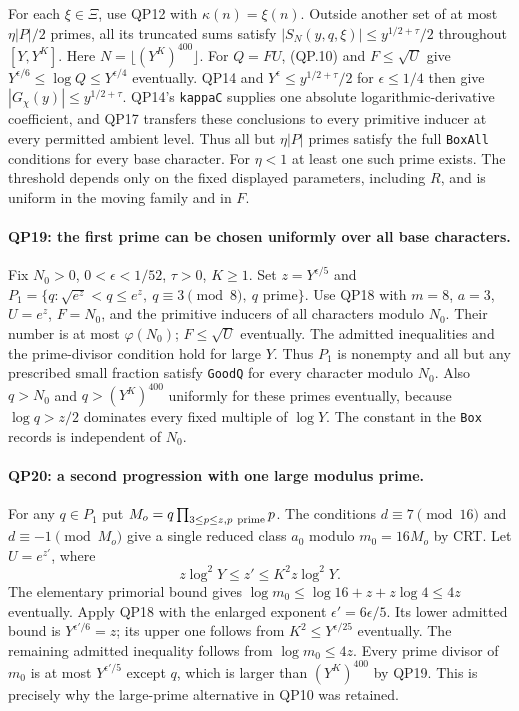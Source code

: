 For each $\xi\in\Xi$, use QP12 with $\kappa(n)=\xi(n)$.
Outside another set of at most $\eta|P|/2$ primes, all its truncated
sums satisfy $|S_N(y,q,\xi)|\le y^{1/2+\tau}/2$ throughout
$[Y,Y^K]$.  Here $N=\lfloor(Y^K)^{400}\rfloor$.
For $Q=FU$, (QP.10) and $F\le\sqrt U$ give
$Y^{\epsilon/6}\le\log Q\le Y^{\epsilon/4}$ eventually.
QP14 and $Y^\epsilon\le y^{1/2+\tau}/2$ for $\epsilon\le1/4$
then give $|G_\chi(y)|\le y^{1/2+\tau}$.
QP14's \texttt{kappaC} supplies one absolute logarithmic-derivative
coefficient, and QP17 transfers these conclusions to every primitive
inducer at every permitted ambient level.
Thus all but $\eta|P|$ primes satisfy the full \texttt{BoxAll} conditions
for every base character.  For $\eta<1$ at least one such prime exists.
The threshold depends only on the fixed displayed parameters, including
$R$, and is uniform in the moving family and in $F$.

\paragraph{QP19: the first prime can be chosen uniformly over all base characters.}
Fix $N_0>0$, $0<\epsilon<1/52$, $\tau>0$, $K\ge1$.
Set $z=Y^{\epsilon/5}$ and
$P_1=\{q:\sqrt{e^z}<q\le e^z,\ q\equiv3\pmod8,\ q\text{ prime}\}$.
Use QP18 with $m=8$, $a=3$, $U=e^z$, $F=N_0$, and the primitive
inducers of all characters modulo $N_0$.
Their number is at most $\varphi(N_0)$; $F\le\sqrt U$ eventually.
The admitted inequalities and the prime-divisor condition hold for
large $Y$.  Thus $P_1$ is nonempty and all but any prescribed small
fraction satisfy \texttt{GoodQ} for every character modulo $N_0$.
Also $q>N_0$ and $q>(Y^K)^{400}$ uniformly for these primes eventually,
because $\log q>z/2$ dominates every fixed multiple of $\log Y$.
The constant in the \texttt{Box} records is independent of $N_0$.

\paragraph{QP20: a second progression with one large modulus prime.}
For any $q\in P_1$ put
$M_o=q\prod_{3\le p\le z, p\ {\rm prime}}p$.
The conditions $d\equiv7\pmod{16}$ and $d\equiv-1\pmod{M_o}$
give a single reduced class $a_0$ modulo $m_0=16M_o$ by CRT.
Let $U=e^{z'}$, where
\[
 z\log^2Y\le z'\le K^2 z\log^2Y.                    \tag{QP.27}
\]
The elementary primorial bound gives
$\log m_0\le\log16+z+z\log4\le4z$ eventually.
Apply QP18 with the enlarged exponent $\epsilon'=6\epsilon/5$.
Its lower admitted bound is $Y^{\epsilon'/6}=z$;
its upper one follows from $K^2\le Y^{\epsilon/25}$ eventually.
The remaining admitted inequality follows from $\log m_0\le4z$.
Every prime divisor of $m_0$ is at most $Y^{\epsilon'/5}$ except $q$,
which is larger than $(Y^K)^{400}$ by QP19.  This is precisely why the
large-prime alternative in QP10 was retained.

